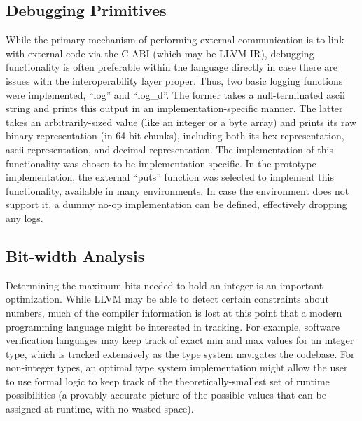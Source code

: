 \documentclass[12pt,a4paper,twoside]{report}
\begin{document}
\subsection{Debugging Primitives}

While the primary mechanism of performing external communication is to link with external code via the C ABI (which may be LLVM IR), debugging functionality is often preferable within the language directly in case there are issues with the interoperability layer proper. Thus, two basic logging functions were implemented, ``log'' and ``log\_d''. The former takes a null-terminated ascii string and prints this output in an implementation-specific manner. The latter takes an arbitrarily-sized value (like an integer or a byte array) and prints its raw binary representation (in 64-bit chunks), including both its hex representation, ascii representation, and decimal representation. The implementation of this functionality was chosen to be implementation-specific. In the prototype implementation, the external ``puts'' function was selected to implement this functionality, available in many environments. In case the environment does not support it, a dummy no-op implementation can be defined, effectively dropping any logs.

\subsection{Bit-width Analysis}

Determining the maximum bits needed to hold an integer is an important optimization. While LLVM may be able to detect certain constraints about numbers, much of the compiler information is lost at this point that a modern programming language might be interested in tracking. For example, software verification languages may keep track of exact min and max values for an integer type, which is tracked extensively as the type system navigates the codebase. For non-integer types, an optimal type system implementation might allow the user to use formal logic to keep track of the theoretically-smallest set of runtime possibilities (a provably accurate picture of the possible values that can be assigned at runtime, with no wasted space).
\end{document}
